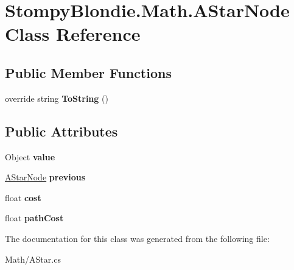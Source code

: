 \hypertarget{class_stompy_blondie_1_1_math_1_1_a_star_node}{}\section{Stompy\+Blondie.\+Math.\+A\+Star\+Node Class Reference}
\label{class_stompy_blondie_1_1_math_1_1_a_star_node}
\subsection*{Public Member Functions}
\begin{DoxyCompactItemize}
\item 
\mbox{\label{class_stompy_blondie_1_1_math_1_1_a_star_node_aec950ec9440e54a2b7883a2f60529126}} 
override string {\bfseries To\+String} ()
\end{DoxyCompactItemize}
\subsection*{Public Attributes}
\begin{DoxyCompactItemize}
\item 
\mbox{\label{class_stompy_blondie_1_1_math_1_1_a_star_node_a14b61327ae92e9836a6b04f686f1ba0d}} 
Object {\bfseries value}
\item 
\mbox{\label{class_stompy_blondie_1_1_math_1_1_a_star_node_a6662a6b1121e342f55c14609b7f160db}} 
\mbox{\hyperlink{class_stompy_blondie_1_1_math_1_1_a_star_node}{A\+Star\+Node}} {\bfseries previous}
\item 
\mbox{\label{class_stompy_blondie_1_1_math_1_1_a_star_node_a88be85813ab33cf6c852379872cfb642}} 
float {\bfseries cost}
\item 
\mbox{\label{class_stompy_blondie_1_1_math_1_1_a_star_node_a15610dea8c44d1798c15777dc7853502}} 
float {\bfseries path\+Cost}
\end{DoxyCompactItemize}


The documentation for this class was generated from the following file\+:\begin{DoxyCompactItemize}
\item 
Math/A\+Star.\+cs\end{DoxyCompactItemize}
